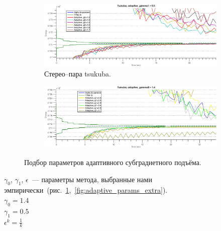 \documentclass{article}
\begin{document}
\begin{figure}
    \centering
    \begin{subfigure}[t]{\textwidth}
            \centering
            \includegraphics[width=\textwidth]{adaptive_g0_tsukuba}
            \caption{Стерео--пара tsukuba.}
    \end{subfigure}
    \begin{subfigure}[t]{\textwidth}
            \centering
            \includegraphics[width=\textwidth]{adaptive_g1_tsukuba}
    \end{subfigure}
    \caption{Подбор параметров адаптивного субградиетного подъёма.}
    \label{fig:adaptive_params}
\end{figure}

$\gamma_0$, $\gamma_1$, $\epsilon$~--- параметры метода, выбранные нами эмпирически~(рис.~\ref{fig:adaptive_params},~\ref{fig:adaptive_params_extra}).\\
$\gamma_0 = 1.4$\\
$\gamma_1 = 0.5$\\
$\epsilon^k = \frac{1}{k}$\\
\end{document}
